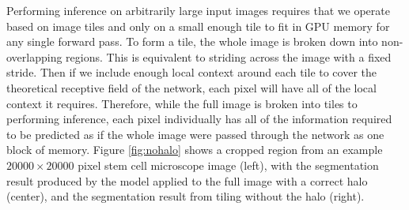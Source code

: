 \documentclass[10pt, indentfirst]{article}
\begin{document}
Performing inference on arbitrarily large input images requires that we operate based on image tiles and only on a small enough tile to fit in GPU memory for any single forward pass. To form a tile, the whole image is broken down into non-overlapping regions. This is equivalent to striding across the image with a fixed stride. Then if we include enough local context around each tile to cover the theoretical receptive field of the network, each pixel will have all of the local context it requires. Therefore, while the full image is broken into tiles to performing inference, each pixel individually has all of the information required to be predicted as if the whole image were passed through the network as one block of memory. Figure \ref{fig:nohalo} shows a cropped region from an example $\num{20000} \times \num{20000}$ pixel stem cell microscope image (left), with the segmentation result produced by the model applied to the full image with a correct halo (center), and the segmentation result from tiling without the halo (right). 
\end{document}
